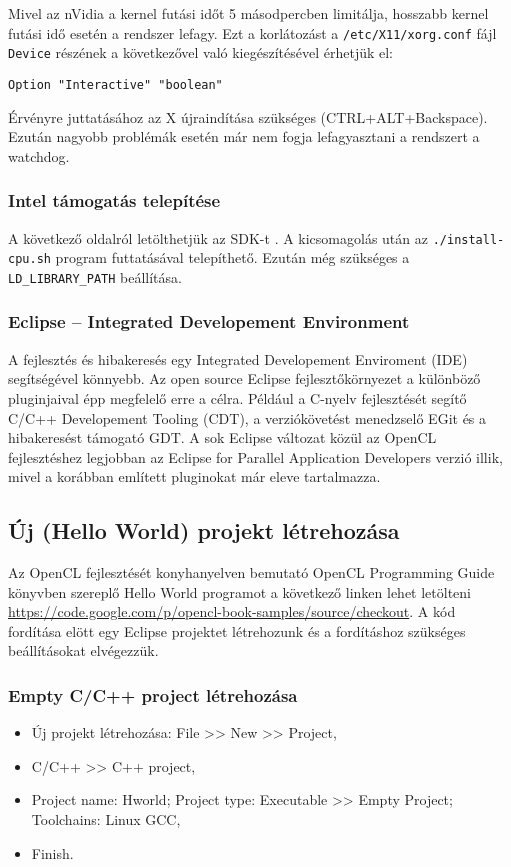 	Mivel az nVidia a kernel futási időt 5 másodpercben limitálja,
	hosszabb kernel futási idő esetén a rendszer lefagy.
	Ezt a korlátozást a \texttt{/etc/X11/xorg.conf} fájl \texttt{Device} részének a
	következővel való kiegészítésével érhetjük el:
\begin{lstlisting}
Option "Interactive" "boolean"
\end{lstlisting}
	Érvényre juttatásához az X újraindítása szükséges (CTRL+ALT+Backspace).
	Ezután nagyobb problémák esetén már nem fogja lefagyasztani a rendszert a
	watchdog.

\subsubsection*{Intel támogatás telepítése}
	A következő oldalról letölthetjük az SDK-t \cite{intel-sdk}.
	A kicsomagolás után az \texttt{./install-cpu.sh} program futtatásával
	telepíthető.
	Ezután még szükséges a \texttt{LD\_LIBRARY\_PATH} beállítása.

\subsubsection*{Eclipse – Integrated Developement Environment}
	A fejlesztés és hibakeresés egy Integrated Developement Enviroment (IDE) segítségével könnyebb.
	Az open source Eclipse \cite{eclipse} fejlesztőkörnyezet a különböző pluginjaival épp megfelelő erre a célra.
	Például a C-nyelv fejlesztését segítő C/C++ Developement Tooling (CDT), a verziókövetést menedzselő EGit és a hibakeresést támogató GDT.
	A sok Eclipse változat közül az OpenCL fejlesztéshez legjobban az
	Eclipse for Parallel Application Developers verzió illik, mivel a korábban említett pluginokat már eleve tartalmazza.

\subsection*{Új (Hello World) projekt létrehozása}
	Az OpenCL fejlesztését konyhanyelven bemutató OpenCL Programming Guide \cite{Munshi2011}
	könyvben szereplő Hello World programot a következő linken lehet letölteni
	\url{https://code.google.com/p/opencl-book-samples/source/checkout}.
	A kód fordítása elött egy Eclipse projektet létrehozunk és a fordításhoz szükséges beállításokat elvégezzük.
	
\subsubsection*{Empty C/C++ project létrehozása}
	\begin{itemize}[noitemsep]
		\item Új projekt létrehozása: File >> New >> Project,
		\item C/C++ >> C++ project,
		\item Project name: Hworld; Project type: Executable >> Empty Project; Toolchains: Linux GCC,
		\item Finish.
	\end{itemize}
	
